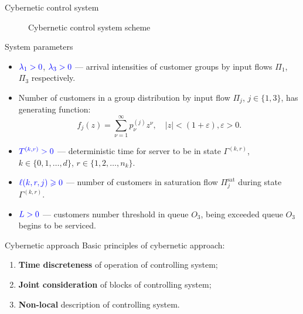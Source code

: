 \documentclass[10pt]{beamer}
\begin{document}
\begin{frame}{Cybernetic control system}
  \begin{figure}[h]
    \centering
    \caption{Cybernetic control system scheme}
    \label{VK:fig:2}
  \end{figure}
\end{frame} 


\begin{frame}{System parameters}
\begin{itemize}
    \item 
$\color{blue}\lambda_1>0$, $\color{blue}\lambda_3>0$ --- arrival intensities of customer groups by input flows  $\Pi_1$, $\Pi_3$ respectively.
  \item 
{\color{blue}Number of customers in a group distribution} by input flow $\Pi_j$, $j \in \{1,3\}$, has generating function:
\begin{equation}
f_j(z) = \sum_{\nu=1}^{\infty} p_{\nu}^{(j)} z ^{\nu}, \quad |z|<(1+\varepsilon), \varepsilon>0.
    \end{equation}
  \item 
$\color{blue}T^{(k,r)}>0$ --- deterministic time for server to be in state $\Gamma^{(k,r)}$, $k\in \{0, 1, \ldots, d\}$, $r \in \{1, 2, \ldots, n_k\}$.  
  \item 
$\color{blue}\ell(k,r,j)\geqslant 0$ --- number of customers in saturation flow $\Pi^{\text{sat}}_j$  during state  $\Gamma^{(k,r)}$.
  \item 
$\color{blue}L > 0$ --- customers number threshold in queue $O_3$, being exceeded queue $O_3$ begins to be serviced.
\end{itemize}

\end{frame}

\begin{frame}{Cybernetic approach}
Basic principles of cybernetic approach:
\medskip
  \begin{enumerate}
  \item  \textbf{Time discreteness} of operation of controlling system;
  \medskip  
  \item \textbf{Joint consideration} of blocks of controlling system;
  \medskip
  \item \textbf{Non-local} description of controlling system.
  \end{enumerate}    
\end{frame}
\end{document}
